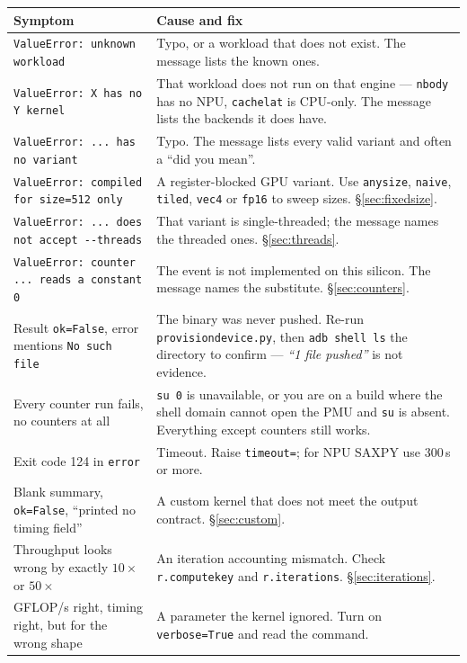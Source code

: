\documentclass[11pt,a4paper]{article}
\newcommand{\code}[1]{\texttt{\let\_\breakableunderscore #1}}
\newcommand{\breakableunderscore}{\textunderscore\allowbreak}
\begin{document}
\begin{longtable}{@{}p{5.1cm}p{9.6cm}@{}}
\toprule
\textbf{Symptom} & \textbf{Cause and fix} \\
\midrule
\endhead
\code{ValueError: unknown workload} & Typo, or a workload that does not exist.
  The message lists the known ones. \\
\code{ValueError: X has no Y kernel} & That workload does not run on that
  engine --- \code{nbody} has no NPU, \code{cachelat} is CPU-only. The message
  lists the backends it does have. \\
\code{ValueError: ... has no variant} & Typo. The message lists every valid
  variant and often a ``did you mean''. \\
\code{ValueError: compiled for size=512 only} & A register-blocked GPU variant.
  Use \code{anysize}, \code{naive}, \code{tiled}, \code{vec4} or \code{fp16}
  to sweep sizes. \S\ref{sec:fixedsize}. \\
\code{ValueError: ... does not accept -{}-threads} & That variant is
  single-threaded; the message names the threaded ones. \S\ref{sec:threads}. \\
\code{ValueError: counter ... reads a constant 0} & The event is not
  implemented on this silicon. The message names the substitute.
  \S\ref{sec:counters}. \\
Result \code{ok=False}, error mentions \code{No such file} & The binary was
  never pushed. Re-run \code{provision\_device.py}, then
  \code{adb shell ls} the directory to confirm --- \emph{``1 file pushed''} is
  not evidence. \\
Every counter run fails, no counters at all & \code{su 0} is unavailable, or
  you are on a build where the shell domain cannot open the PMU and \code{su}
  is absent. Everything except counters still works. \\
Exit code 124 in \code{error} & Timeout. Raise \code{timeout=}; for NPU SAXPY
  use 300\,s or more. \\
Blank summary, \code{ok=False}, ``printed no timing field'' & A custom kernel
  that does not meet the output contract. \S\ref{sec:custom}. \\
Throughput looks wrong by exactly $10\times$ or $50\times$ & An iteration
  accounting mismatch. Check \code{r.compute\_key} and \code{r.iterations}.
  \S\ref{sec:iterations}. \\
GFLOP/s right, timing right, but for the wrong shape & A parameter the kernel
  ignored. Turn on \code{verbose=True} and read the command. \\

\end{longtable}
\end{document}

